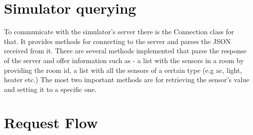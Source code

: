 \section{Simulator querying}
To communicate with the simulator's server there is the Connection class for that. It provides methods for connecting to the server and parses the JSON received from it. There are several methods implemented that parse the response of the server and offer information such as - a list with the sensors in a room by providing the room id, a list with all the sensors of a certain type (e.g ac, light, heater etc.) The most two important methods are for retrieving the sensor's value and setting it to a specific one. 
\section{Request Flow}